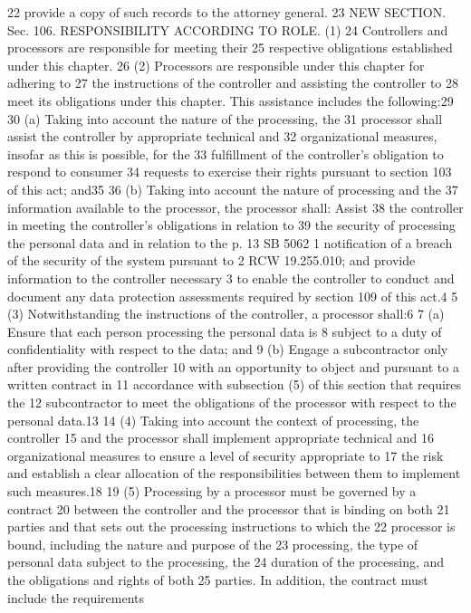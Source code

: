 22 provide a copy of such records to the attorney general.
23 NEW SECTION. Sec. 106. RESPONSIBILITY ACCORDING TO ROLE. (1)
24 Controllers and processors are responsible for meeting their
25 respective obligations established under this chapter.
26 (2) Processors are responsible under this chapter for adhering to
27 the instructions of the controller and assisting the controller to
28 meet its obligations under this chapter. This assistance includes the
following:29
30 (a) Taking into account the nature of the processing, the
31 processor shall assist the controller by appropriate technical and
32 organizational measures, insofar as this is possible, for the
33 fulfillment of the controller's obligation to respond to consumer
34 requests to exercise their rights pursuant to section 103 of this
act; and35
36 (b) Taking into account the nature of processing and the
37 information available to the processor, the processor shall: Assist
38 the controller in meeting the controller's obligations in relation to
39 the security of processing the personal data and in relation to the
p. 13 SB 5062
1 notification of a breach of the security of the system pursuant to
2 RCW 19.255.010; and provide information to the controller necessary
3 to enable the controller to conduct and document any data protection
assessments required by section 109 of this act.4
5 (3) Notwithstanding the instructions of the controller, a
processor shall:6
7 (a) Ensure that each person processing the personal data is
8 subject to a duty of confidentiality with respect to the data; and
9 (b) Engage a subcontractor only after providing the controller
10 with an opportunity to object and pursuant to a written contract in
11 accordance with subsection (5) of this section that requires the
12 subcontractor to meet the obligations of the processor with respect
to the personal data.13
14 (4) Taking into account the context of processing, the controller
15 and the processor shall implement appropriate technical and
16 organizational measures to ensure a level of security appropriate to
17 the risk and establish a clear allocation of the responsibilities
between them to implement such measures.18
19 (5) Processing by a processor must be governed by a contract
20 between the controller and the processor that is binding on both
21 parties and that sets out the processing instructions to which the
22 processor is bound, including the nature and purpose of the
23 processing, the type of personal data subject to the processing, the
24 duration of the processing, and the obligations and rights of both
25 parties. In addition, the contract must include the requirements
